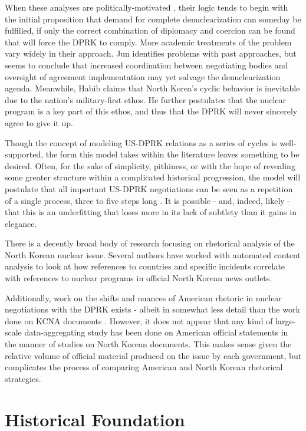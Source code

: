 \documentclass{article}
\begin{document}
When these analyses are politically-motivated \cite{blair, cfr}, their logic tends to begin with the initial proposition that demand for complete denuclearization can someday be fulfilled, if only the correct combination of diplomacy and coercion can be found that will force the DPRK to comply. More academic treatments of the problem \cite{habib,jun} vary widely in their approach. Jun \cite{jun} identifies problems with past approaches, but seems to conclude that increased coordination between negotiating bodies and oversight of agreement implementation may yet salvage the denuclearization agenda. Meanwhile, Habib \cite{habib} claims that North Korea’s cyclic behavior is inevitable due to the nation’s military-first ethos. He further postulates that the nuclear program is a key part of this ethos, and thus that the DPRK will never sincerely agree to give it up.

Though the concept of modeling US-DPRK relations as a series of cycles is well-supported, the form this model takes within the literature leaves something to be desired. Often, for the sake of simplicity, pithiness, or with the hope of revealing some greater structure within a complicated historical progression, the model will postulate that all important US-DPRK negotiations can be seen as a repetition of a single process, three to five steps long \cite{fisher,jun}. It is possible - and, indeed, likely - that this is an underfitting that loses more in its lack of subtlety than it gains in elegance.

There is a decently broad body of research focusing on rhetorical analysis of the North Korean nuclear issue. Several authors \cite{rich12, rich14, sin} have worked with automated content analysis to look at how references to countries and specific incidents correlate with references to nuclear programs in official North Korean news outlets.

Additionally, work on the shifts and nuances of American rhetoric in nuclear negotiations with the DPRK exists - albeit in somewhat less detail than the work done on KCNA documents \cite{bleiker,cumings,harnisch,huntley}. However, it does not appear that any kind of large-scale data-aggregating study has been done on American official statements in the manner of studies on North Korean documents. This makes sense given the relative volume of official material produced on the issue by each government, but complicates the process of comparing American and North Korean rhetorical strategies.

\section{Historical Foundation}
\end{document}

